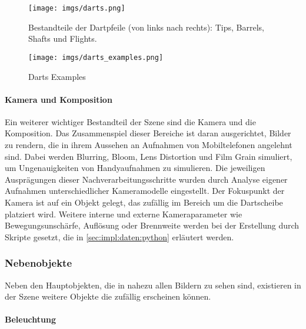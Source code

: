\begin{figure}
    \centering
    \texttt{[image: imgs/darts.png]}
    \caption{Bestandteile der Dartpfeile (von links nach rechts): Tips, Barrels, Shafts und Flights.}
    \label{img:dartpfeil_teile}
\end{figure}

\begin{figure}
    \centering
    \texttt{[image: imgs/darts\_examples.png]}
    \caption{Darts Examples}
    \label{img:dart_examples}
\end{figure}

\paragraph{Kamera und Komposition}
\label{sec:impl:daten:blender:hauptobjekte:kamera}

Ein weiterer wichtiger Bestandteil der Szene sind die Kamera und die Komposition. Das Zusammenspiel dieser Bereiche ist daran ausgerichtet, Bilder zu rendern, die in ihrem Aussehen an Aufnahmen von Mobiltelefonen angelehnt sind. Dabei werden Blurring, Bloom, Lens Distortion und Film Grain simuliert, um Ungenauigkeiten von Handyaufnahmen zu simulieren. Die jeweiligen Ausprägungen dieser Nachverarbeitungsschritte wurden durch Analyse eigener Aufnahmen unterschiedlicher Kameramodelle eingestellt. Der Fokuspunkt der Kamera ist auf ein Objekt gelegt, das zufällig im Bereich um die Dartscheibe platziert wird. Weitere interne und externe Kameraparameter wie Bewegungsunschärfe, Auflösung oder Brennweite werden bei der Erstellung durch Skripte gesetzt, die in \autoref{sec:impl:daten:python} erläutert werden.

\subsubsection{Nebenobjekte}
\label{sec:impl:daten:blender:nebenobjekte}

Neben den Hauptobjekten, die in nahezu allen Bildern zu sehen sind, existieren in der Szene weitere Objekte die zufällig erscheinen können.

\paragraph{Beleuchtung}
\label{sec:impl:daten:blender:nebenobjekte:licht}

